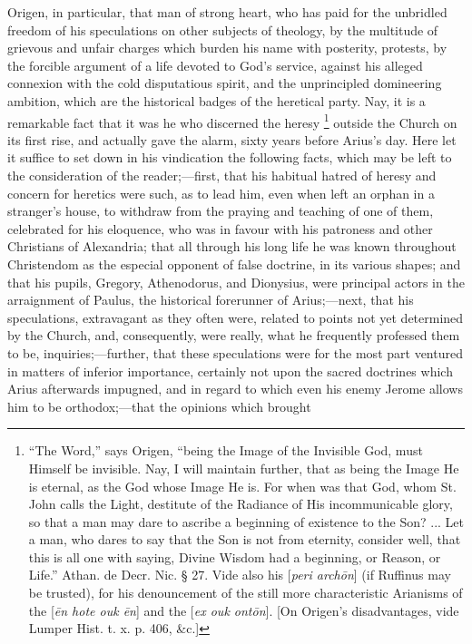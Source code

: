 Origen, in particular, that man of strong heart, who has paid for
the unbridled freedom of his speculations on other subjects of
theology, by the multitude of grievous and unfair charges which burden
his name with posterity, protests, by the forcible argument of a life
devoted to God's service, against his alleged connexion with the cold
disputatious spirit, and the unprincipled domineering ambition, which
are the historical badges of the heretical party. Nay, it is a
remarkable fact that it was he who discerned the heresy \footnote{``The Word,'' says Origen, ``being the Image of the Invisible God, must Himself be invisible. Nay,
I will maintain further, that as being the Image He is eternal, as the
God whose Image He is. For when was that God, whom St. John calls the
Light, destitute of the Radiance of His incommunicable glory, so that
a man may dare to ascribe a beginning of existence to the Son? ... Let
a man, who dares to say that the Son is not from eternity, consider
well, that this is all one with saying, Divine Wisdom had a beginning,
or Reason, or Life.'' Athan. de Decr. Nic. § 27. Vide also his [\emph{peri
arch\={o}n}] (if Ruffinus may be trusted), for his denouncement
of the still more characteristic Arianisms of the [\emph{\={e}n hote
ouk \={e}n}] and the [\emph{ex ouk ont\={o}n}]. [On Origen's
disadvantages, vide Lumper Hist. t. x. p. 406, \&c.]} outside the Church on its first rise, and actually gave the
alarm, sixty years before Arius's day. Here let it suffice to set
down in his vindication the following facts, which may be left to the
consideration of the reader;—first, that his habitual hatred of
heresy and concern for heretics were such, as to lead him, even when
left an orphan in a stranger's house, to withdraw from the praying and
teaching of one of them, celebrated for his eloquence, who was in
favour with his patroness and other Christians of Alexandria; that all
through his long life he was known throughout Christendom as the
especial opponent of false doctrine, in its various shapes; and that
his pupils, Gregory, Athenodorus, and Dionysius, were principal actors
in the arraignment of Paulus, the historical forerunner of Arius;—next,
that his speculations, extravagant as they often were, related to
points not yet determined by the Church, and, consequently, were
really, what he frequently professed them to be, inquiries;—further,
that these speculations were for the most part ventured in matters of
inferior importance, certainly not upon the sacred doctrines which
Arius afterwards impugned, and in regard to which even his enemy
Jerome allows him to be orthodox;—that the opinions which brought
